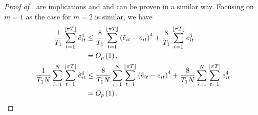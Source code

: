 \documentclass[12pt]{article}
\theoremstyle{plain}
\numberwithin{equation}{section}
\begin{document}
\begin{proof}[Proof of ]
 are implications and  and can be proven in a similar way. Focusing on $m = 1$ as the case for $m = 2$ is similar, we have
\begin{align*}
\frac{1}{T_1} \sum_{t = 1}^{\left \lfloor \pi T \right \rfloor} \tilde{e}_{it}^4 &\leq 
\frac{8}{T_1} \sum_{t = 1}^{\left \lfloor \pi T \right \rfloor} \left( \tilde{e}_{it} - e_{it} \right)^4 +
\frac{8}{T_1} \sum_{t = 1}^{\left \lfloor \pi T \right \rfloor} e_{it}^4 \\
&= O_p \left( 1 \right), \\
\frac{1}{T_1 N} \sum_{i = 1}^{N} \sum_{t = 1}^{\left \lfloor \pi T \right \rfloor} \tilde{e}_{it}^4 &\leq 
\frac{8}{T_1 N} \sum_{i = 1}^{N} \sum_{t = 1}^{\left \lfloor \pi T \right \rfloor} \left( \tilde{e}_{it} - e_{it} \right)^4 +
\frac{8}{T_1 N} \sum_{i = 1}^{N} \sum_{t = 1}^{\left \lfloor \pi T \right \rfloor} e_{it}^4 \\
&= O_p \left( 1 \right).
\end{align*}
\end{proof}

\end{document}
